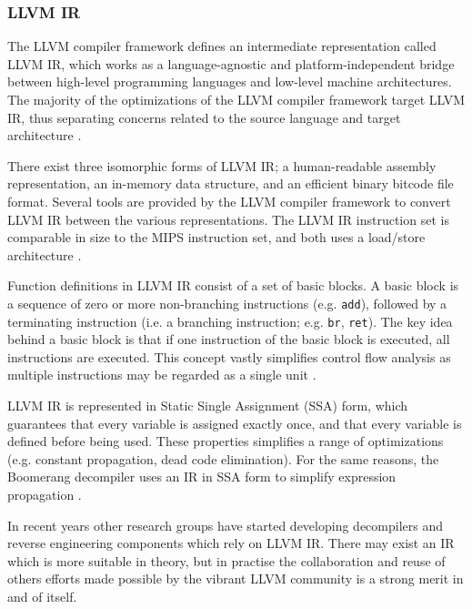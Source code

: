
\subsubsection{LLVM IR}
\label{sec:lit_review_llvm_ir}

The LLVM compiler framework defines an intermediate representation called LLVM IR, which works as a language-agnostic and platform-independent bridge between high-level programming languages and low-level machine architectures. The majority of the optimizations of the LLVM compiler framework target LLVM IR, thus separating concerns related to the source language and target architecture \cite{llvm_architecture}.

There exist three isomorphic forms of LLVM IR; a human-readable assembly representation, an in-memory data structure, and an efficient binary bitcode file format. Several tools are provided by the LLVM compiler framework to convert LLVM IR between the various representations. The LLVM IR instruction set is comparable in size to the MIPS instruction set, and both uses a load/store architecture \cite{mips_ref,llvm_lang_ref}.

Function definitions in LLVM IR consist of a set of basic blocks. A basic block is a sequence of zero or more non-branching instructions (e.g. \texttt{add}), followed by a terminating instruction (i.e. a branching instruction; e.g. \texttt{br}, \texttt{ret}). The key idea behind a basic block is that if one instruction of the basic block is executed, all instructions are executed. This concept vastly simplifies control flow analysis as multiple instructions may be regarded as a single unit \cite{decomp_of_llvm}.

LLVM IR is represented in Static Single Assignment (SSA) form, which guarantees that every variable is assigned exactly once, and that every variable is defined before being used. These properties simplifies a range of optimizations (e.g. constant propagation, dead code elimination). For the same reasons, the Boomerang decompiler uses an IR in SSA form to simplify expression propagation \cite{ssa_for_decomp}.

In recent years other research groups have started developing decompilers \cite{decomp_of_llvm,retargetable_decomp} and reverse engineering components \cite{mcsema} which rely on LLVM IR. There may exist an IR which is more suitable in theory, but in practise the collaboration and reuse of others efforts made possible by the vibrant LLVM community is a strong merit in and of itself.


